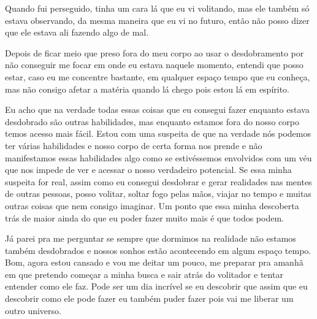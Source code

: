 Quando fui perseguido, tinha um cara lá que eu vi volitando, mas ele também só estava observando, da mesma maneira que eu vi no futuro, então não posso dizer que ele estava ali fazendo algo de mal.

Depois de ficar meio que preso fora do meu corpo ao usar o desdobramento por não conseguir me focar em onde eu estava naquele momento, entendi que posso estar, caso eu me concentre bastante, em qualquer espaço tempo que eu conheça, mas não consigo afetar a matéria quando lá chego pois estou lá em espírito.

Eu acho que na verdade todas essas coisas que eu consegui fazer enquanto estava desdobrado são outras habilidades, mas enquanto estamos fora do nosso corpo temos acesso mais fácil. Estou com uma suspeita de que na verdade nós podemos ter várias habilidades e nosso corpo de certa forma nos prende e não manifestamos essas habilidades algo como se estivéssemos envolvidos com um véu que nos impede de ver e acessar o nosso verdadeiro potencial. Se essa minha suspeita for real, assim como eu consegui desdobrar e gerar realidades nas mentes de outras pessoas, posso volitar, soltar fogo pelas mãos, viajar no tempo e muitas outras coisas que nem consigo imaginar. Um ponto que essa minha descoberta trás de maior ainda do que eu poder fazer muito mais é que todos podem.

Já parei pra me perguntar se sempre que dormimos na realidade não estamos também desdobrados e nossos sonhos estão acontecendo em algum espaço tempo.
Bom, agora estou cansado e vou me deitar um pouco, me preparar pra amanhã em que pretendo começar a minha busca e sair atrás do volitador e tentar entender como ele faz. Pode ser um dia incrível se eu descobrir que assim que eu descobrir como ele pode fazer eu também puder fazer pois vai me liberar um outro universo.


